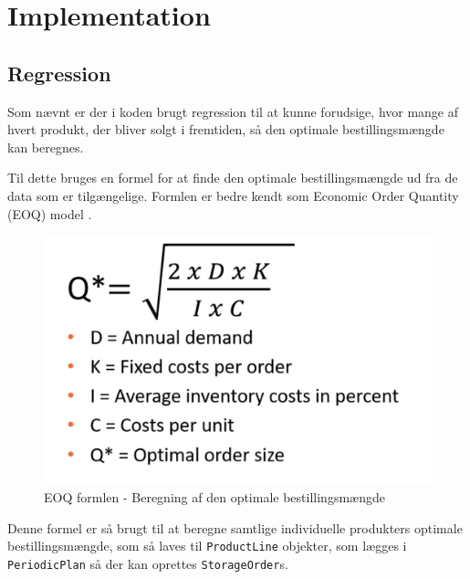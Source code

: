 \chapter{Implementation}\label{ch:implementation}

\section{Regression}
Som nævnt er der i koden brugt regression til at kunne forudsige, hvor mange af hvert produkt, der bliver solgt i fremtiden, så den optimale bestillingsmængde kan beregnes. 


Til dette bruges en formel for at finde den optimale bestillingsmængde ud fra de data som er tilgængelige. Formlen er bedre kendt som Economic Order Quantity (EOQ) model \cite{EOQ}.

\begin{landscape}
    \begin{figure}[p]
        \centering
        \includegraphics[width=\hsize]{figures/implementation/eoq.png}
        \caption{EOQ formlen - Beregning af den optimale bestillingsmængde}
        \label{fig:eoq}
    \end{figure}
\end{landscape}

Denne formel er så brugt til at beregne samtlige individuelle produkters optimale bestillingsmængde, som så laves til \verb|ProductLine| objekter, som lægges i \verb|PeriodicPlan| så der kan oprettes \verb|StorageOrder|s. 
